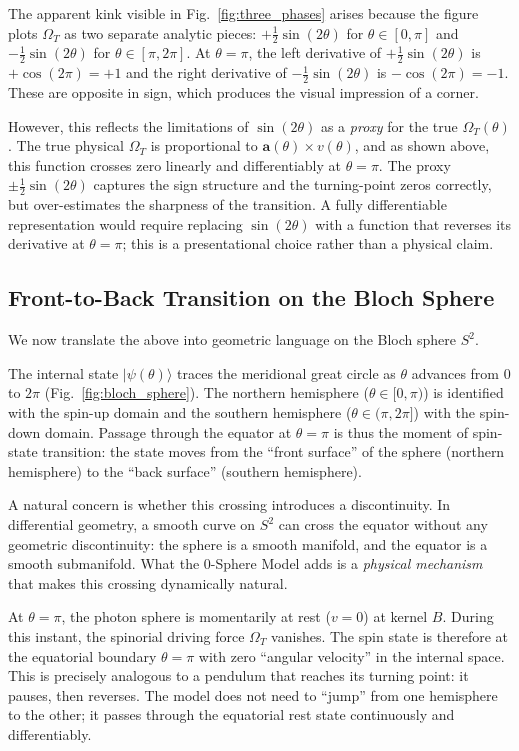 \documentclass[%
 reprint,
 amsmath,amssymb,
 aps,
 prb,
]{revtex4-2}
\numberwithin{equation}{section}
\theoremstyle{definition}
\theoremstyle{remark}
\begin{document}
The apparent kink visible in Fig.~\ref{fig:three_phases} arises because the figure plots $\Omega_T$ as two separate analytic pieces: $+\tfrac{1}{2}\sin(2\theta)$ for $\theta \in [0,\pi]$ and $-\tfrac{1}{2}\sin(2\theta)$ for $\theta \in [\pi, 2\pi]$. At $\theta = \pi$, the left derivative of $+\tfrac{1}{2}\sin(2\theta)$ is $+\cos(2\pi) = +1$ and the right derivative of $-\tfrac{1}{2}\sin(2\theta)$ is $-\cos(2\pi) = -1$. These are opposite in sign, which produces the visual impression of a corner.

However, this reflects the limitations of $\sin(2\theta)$ as a \emph{proxy} for the true $\Omega_T(\theta)$. The true physical $\Omega_T$ is proportional to $\bm{a}(\theta) \times v(\theta)$, and as shown above, this function crosses zero linearly and differentiably at $\theta = \pi$. The proxy $\pm\tfrac{1}{2}\sin(2\theta)$ captures the sign structure and the turning-point zeros correctly, but over-estimates the sharpness of the transition. A fully differentiable representation would require replacing $\sin(2\theta)$ with a function that reverses its derivative at $\theta = \pi$; this is a presentational choice rather than a physical claim.

\subsection{Front-to-Back Transition on the Bloch Sphere}

We now translate the above into geometric language on the Bloch sphere $S^2$.

The internal state $|\psi(\theta)\rangle$ traces the meridional great circle as $\theta$ advances from $0$ to $2\pi$ (Fig.~\ref{fig:bloch_sphere}). The northern hemisphere ($\theta \in [0,\pi)$) is identified with the spin-up domain and the southern hemisphere ($\theta \in (\pi, 2\pi]$) with the spin-down domain. Passage through the equator at $\theta = \pi$ is thus the moment of spin-state transition: the state moves from the ``front surface'' of the sphere (northern hemisphere) to the ``back surface'' (southern hemisphere).

A natural concern is whether this crossing introduces a discontinuity. In differential geometry, a smooth curve on $S^2$ can cross the equator without any geometric discontinuity: the sphere is a smooth manifold, and the equator is a smooth submanifold. What the 0-Sphere Model adds is a \emph{physical mechanism} that makes this crossing dynamically natural.

At $\theta = \pi$, the photon sphere is momentarily at rest ($v = 0$) at kernel $B$. During this instant, the spinorial driving force $\Omega_T$ vanishes. The spin state is therefore at the equatorial boundary $\theta = \pi$ with zero ``angular velocity'' in the internal space. This is precisely analogous to a pendulum that reaches its turning point: it pauses, then reverses. The model does not need to ``jump'' from one hemisphere to the other; it passes through the equatorial rest state continuously and differentiably.
\end{document}
